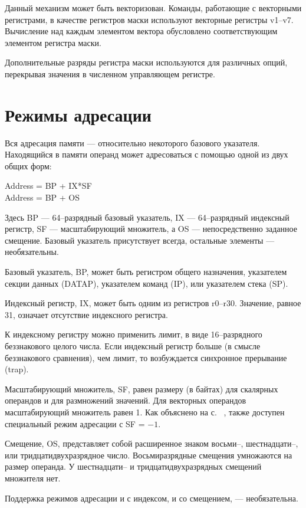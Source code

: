 \documentclass[forwardcom.tex]{subfiles}
\begin{document}
Данный механизм может быть векторизован. Команды, работающие с векторными регистрами, в качестве регистров маски используют векторные регистры v1--v7. Вычисление над каждым элементом вектора обусловлено соответствующим элементом регистра маски.

Дополнительные разряды регистра маски используются для различных опций, перекрывая значения в численном управляющем регистре.

\section{Режимы адресации}
Вся адресация памяти --- относительно некоторого базового указателя. Находящийся в памяти операнд может адресоваться с помощью одной из двух общих форм:
\vspace{5mm}

\parbox{50mm}{%
Address = BP + IX*SF\\
Address = BP + OS}
\vspace{5mm}

Здесь BP --- 64--разрядный базовый указатель, IX --- 64--разрядный индексный регистр, SF --- масштабирующий множитель, а OS --- непосредственно заданное смещение. Базовый указатель присутствует всегда, остальные элементы --- необязательны.

Базовый указатель, BP, может быть регистром общего назначения, указателем секции данных (DATAP), указателем команд (IP), или указателем стека (SP).

Индексный регистр, IX, может быть одним из регистров r0--r30. Значение, равное 31, означает отсутствие индексного регистра.

К индексному регистру можно применить лимит, в виде 16--разрядного беззнакового целого числа. Если индексный регистр больше (в смысле беззнакового сравнения), чем лимит, то возбуждается синхронное прерывание (trap).

Масштабирующий множитель, SF, равен размеру (в байтах) для скалярных операндов и для размножений значений. Для векторных операндов масштабирующий множитель равен 1. Как объяснено на с.~ \pageref{vectorLoops}, также доступен специальный режим адресации с SF = $-1$.

Смещение, OS, представляет собой расширенное знаком восьми--, шестнадцати--, или тридцатидвухразрядное число. Восьмиразрядные смещения умножаются на размер операнда. У шестнадцати-- и тридцатидвухразрядных смещений множителя нет.

Поддержка режимов адресации и с индексом, и со смещением, --- необязательна.
\end{document}
